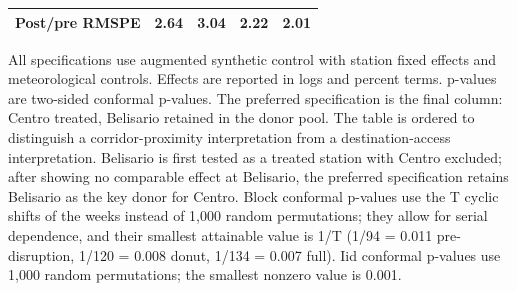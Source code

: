 \begin{table}[htbp]
\begin{threeparttable}
\begin{tabular}{lcccc}
Post/pre RMSPE & 2.64 & 3.04 & 2.22 & 2.01 \\
\bottomrule
\end{tabular}
\begin{tablenotes}\footnotesize
\item All specifications use augmented synthetic control with station fixed effects and meteorological controls. Effects are reported in logs and percent terms. p-values are two-sided conformal p-values. The preferred specification is the final column: Centro treated, Belisario retained in the donor pool. The table is ordered to distinguish a corridor-proximity interpretation from a destination-access interpretation. Belisario is first tested as a treated station with Centro excluded; after showing no comparable effect at Belisario, the preferred specification retains Belisario as the key donor for Centro. Block conformal p-values use the T cyclic shifts of the weeks instead of 1,000 random permutations; they allow for serial dependence, and their smallest attainable value is 1/T (1/94 = 0.011 pre-disruption, 1/120 = 0.008 donut, 1/134 = 0.007 full). Iid conformal p-values use 1,000 random permutations; the smallest nonzero value is 0.001.
\end{tablenotes}
\end{threeparttable}
\end{table}

